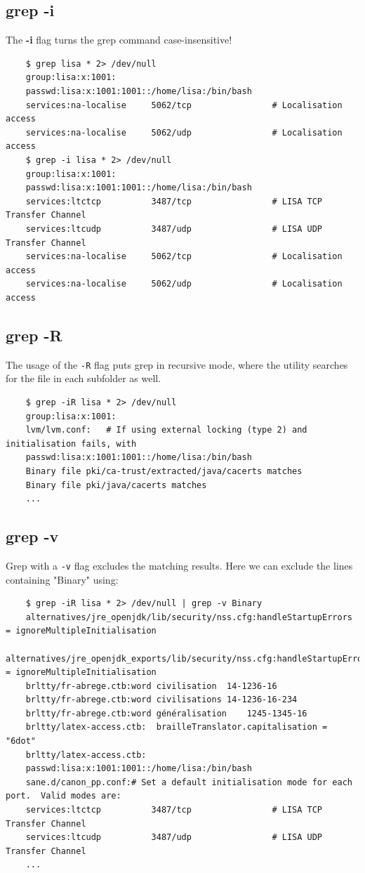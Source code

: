 \documentclass{report}
\begin{document}
	\subsection{grep -i}
	The \textbf{-i} flag turns the grep command case-insensitive!
	
	\begin{verbatim}
	$ grep lisa * 2> /dev/null
	group:lisa:x:1001:
	passwd:lisa:x:1001:1001::/home/lisa:/bin/bash
	services:na-localise     5062/tcp                # Localisation access
	services:na-localise     5062/udp                # Localisation access
	$ grep -i lisa * 2> /dev/null
	group:lisa:x:1001:
	passwd:lisa:x:1001:1001::/home/lisa:/bin/bash
	services:ltctcp          3487/tcp                # LISA TCP Transfer Channel
	services:ltcudp          3487/udp                # LISA UDP Transfer Channel
	services:na-localise     5062/tcp                # Localisation access
	services:na-localise     5062/udp                # Localisation access
	\end{verbatim}
	
	\subsection{grep -R}
	The usage of the \verb|-R| flag puts grep in recursive mode, where the utility searches for the file in each subfolder as well. 
	
	\begin{verbatim}
	$ grep -iR lisa * 2> /dev/null
	group:lisa:x:1001:
	lvm/lvm.conf:	# If using external locking (type 2) and initialisation fails, with
	passwd:lisa:x:1001:1001::/home/lisa:/bin/bash
	Binary file pki/ca-trust/extracted/java/cacerts matches
	Binary file pki/java/cacerts matches
	...
	\end{verbatim}
	
	\subsection{grep -v}
	Grep with a \verb|-v| flag excludes the matching results. Here we can exclude the lines containing "Binary" using:
	
	\begin{verbatim}
	$ grep -iR lisa * 2> /dev/null | grep -v Binary
	alternatives/jre_openjdk/lib/security/nss.cfg:handleStartupErrors = ignoreMultipleInitialisation
	alternatives/jre_openjdk_exports/lib/security/nss.cfg:handleStartupErrors = ignoreMultipleInitialisation
	brltty/fr-abrege.ctb:word civilisation	14-1236-16
	brltty/fr-abrege.ctb:word civilisations	14-1236-16-234
	brltty/fr-abrege.ctb:word généralisation	1245-1345-16
	brltty/latex-access.ctb:  brailleTranslator.capitalisation = "6dot"
	brltty/latex-access.ctb:      
	passwd:lisa:x:1001:1001::/home/lisa:/bin/bash
	sane.d/canon_pp.conf:# Set a default initialisation mode for each port.  Valid modes are:
	services:ltctcp          3487/tcp                # LISA TCP Transfer Channel
	services:ltcudp          3487/udp                # LISA UDP Transfer Channel
	...
	\end{verbatim}
	
\end{document}
